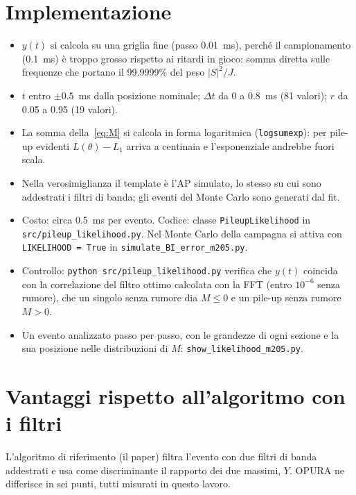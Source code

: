 \documentclass[11pt,a4paper]{article}
\newcommand{\dt}{\Delta t}
\begin{document}
\section{Implementazione}
\begin{sloppypar}
\begin{itemize}
  \item $y(t)$ si calcola su una griglia fine (passo 0.01~ms), perché il campionamento (0.1~ms) è
    troppo grosso rispetto ai ritardi in gioco: somma diretta sulle frequenze che portano il
    99.9999\% del peso $|S|^2/J$.
  \item $t$ entro $\pm0.5$~ms dalla posizione nominale; $\dt$ da 0 a 0.8~ms (81 valori);
    $r$ da 0.05 a 0.95 (19 valori).
  \item La somma della~\eqref{eq:M} si calcola in forma logaritmica (\texttt{logsumexp}): per pile-up
    evidenti $L(\theta)-L_1$ arriva a centinaia e l'esponenziale andrebbe fuori scala.
  \item Nella verosimiglianza il template è l'AP simulato, lo stesso su cui sono addestrati i filtri
    di banda; gli eventi del Monte Carlo sono generati dal fit.
  \item Costo: circa 0.5~ms per evento. Codice: classe \texttt{PileupLikelihood} in
    \texttt{src/pileup\_likelihood.py}. Nel Monte Carlo della campagna si attiva con
    \texttt{LIKELIHOOD = True} in \texttt{simulate\_BI\_error\_m205.py}.
  \item Controllo: \texttt{python src/pileup\_likelihood.py} verifica che $y(t)$ coincida con la
    correlazione del filtro ottimo calcolata con la FFT (entro $10^{-6}$ senza rumore), che un
    singolo senza rumore dia $M\leq0$ e un pile-up senza rumore $M>0$.
  \item Un evento analizzato passo per passo, con le grandezze di ogni sezione e la sua posizione
    nelle distribuzioni di $M$: \texttt{show\_likelihood\_m205.py}.
\end{itemize}
\end{sloppypar}

\section{Vantaggi rispetto all'algoritmo con i filtri}
\label{sec:vantaggi}
L'algoritmo di riferimento (il paper) filtra l'evento con due filtri di banda addestrati e usa come
discriminante il rapporto dei due massimi, $Y$. OPURA ne differisce in sei punti, tutti misurati in
questo lavoro.
\end{document}
